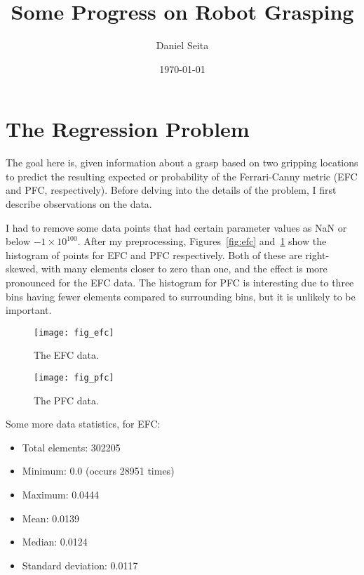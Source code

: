 \documentclass[a4paper, 11pt]{article}
\title{Some Progress on Robot Grasping}
\author{Daniel Seita}
\date{\today}
\begin{document}
\maketitle
\tableofcontents

\clearpage
\section{The Regression Problem}

The goal here is, given information about a grasp based on two gripping locations to predict the
resulting expected or probability of the Ferrari-Canny metric (EFC and PFC, respectively). Before
delving into the details of the problem, I first describe observations on the data.

I had to remove some data points that had certain parameter values as NaN or below $-1 \times
10^{100}$. After my preprocessing, Figures~\ref{fig:efc} and~\ref{fig:pfc} show the histogram of
points for EFC and PFC respectively.  Both of these are right-skewed, with many elements closer to
zero than one, and the effect is more pronounced for the EFC data. The histogram for PFC is
interesting due to three bins having fewer elements compared to surrounding bins, but it is unlikely
to be important.

\begin{figure}[h]
  \centering
  \begin{minipage}{.48\textwidth}
    \centering
    \texttt{[image: fig\_efc]}
    \caption{The EFC data.}
    \label{fig:efc}
  \end{minipage}\hfill
    \begin{minipage}{.48\textwidth}
    \centering
    \texttt{[image: fig\_pfc]}
    \caption{The PFC data.}
    \label{fig:pfc}
  \end{minipage}
\end{figure}

Some more data statistics, for EFC:

\begin{itemize}[noitemsep]
    \item Total elements: 302205
    \item Minimum: 0.0 (occurs 28951 times)
    \item Maximum: 0.0444
    \item Mean: 0.0139
    \item Median: 0.0124
    \item Standard deviation: 0.0117
\end{itemize}
\end{document}

